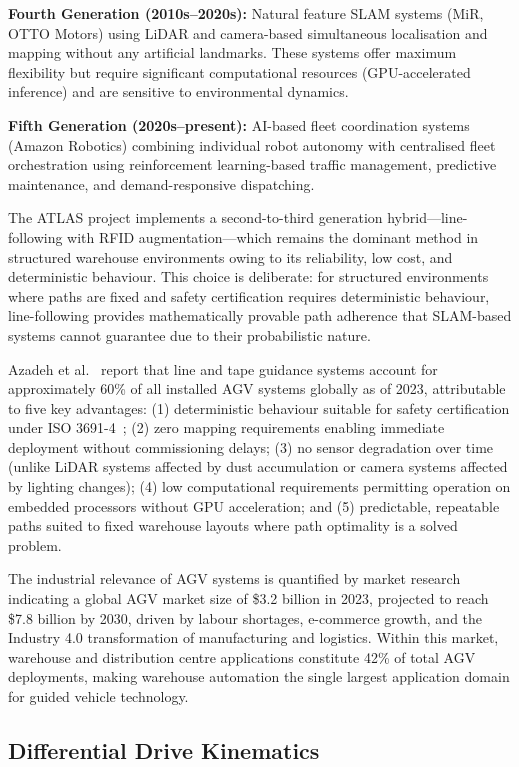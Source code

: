 \documentclass[12pt,a4paper,oneside]{report}
\begin{document}
\textbf{Fourth Generation (2010s--2020s):} Natural feature SLAM systems (MiR, OTTO Motors) using LiDAR and camera-based simultaneous localisation and mapping without any artificial landmarks. These systems offer maximum flexibility but require significant computational resources (GPU-accelerated inference) and are sensitive to environmental dynamics.

\textbf{Fifth Generation (2020s--present):} AI-based fleet coordination systems (Amazon Robotics) combining individual robot autonomy with centralised fleet orchestration using reinforcement learning-based traffic management, predictive maintenance, and demand-responsive dispatching.

The ATLAS project implements a second-to-third generation hybrid---line-following with RFID augmentation---which remains the dominant method in structured warehouse environments owing to its reliability, low cost, and deterministic behaviour. This choice is deliberate: for structured environments where paths are fixed and safety certification requires deterministic behaviour, line-following provides mathematically provable path adherence that SLAM-based systems cannot guarantee due to their probabilistic nature.

Azadeh et al.~\cite{azadeh2019} report that line and tape guidance systems account for approximately 60\% of all installed AGV systems globally as of 2023, attributable to five key advantages: (1) deterministic behaviour suitable for safety certification under ISO 3691-4~\cite{iso3691}; (2) zero mapping requirements enabling immediate deployment without commissioning delays; (3) no sensor degradation over time (unlike LiDAR systems affected by dust accumulation or camera systems affected by lighting changes); (4) low computational requirements permitting operation on embedded processors without GPU acceleration; and (5) predictable, repeatable paths suited to fixed warehouse layouts where path optimality is a solved problem.

The industrial relevance of AGV systems is quantified by market research indicating a global AGV market size of \$3.2 billion in 2023, projected to reach \$7.8 billion by 2030, driven by labour shortages, e-commerce growth, and the Industry 4.0 transformation of manufacturing and logistics. Within this market, warehouse and distribution centre applications constitute 42\% of total AGV deployments, making warehouse automation the single largest application domain for guided vehicle technology.

\subsection{Differential Drive Kinematics}
\end{document}

